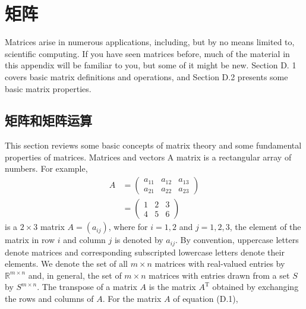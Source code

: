 \documentclass[lang=cn,newtx,10pt,scheme=chinese]{elegantbook}
\begin{document}
\chapter{矩阵}

Matrices arise in numerous applications, including, but by no means limited to, scientific computing. If you have seen matrices before, much of the material in this appendix will be familiar to you, but some of it might be new. Section D. 1 covers basic matrix definitions and operations, and Section D.2 presents some basic matrix properties.

\section{矩阵和矩阵运算}

This section reviews some basic concepts of matrix theory and some fundamental properties of matrices.
Matrices and vectors
A matrix is a rectangular array of numbers. For example,
$$
\begin{aligned}
A & =\left(\begin{array}{lll}
a_{11} & a_{12} & a_{13} \\
a_{21} & a_{22} & a_{23}
\end{array}\right) \\
& =\left(\begin{array}{lll}
1 & 2 & 3 \\
4 & 5 & 6
\end{array}\right)
\end{aligned}
$$
is a $2 \times 3$ matrix $A=\left(a_{i j}\right)$, where for $i=1,2$ and $j=1,2,3$, the element of the matrix in row $i$ and column $j$ is denoted by $a_{i j}$. By convention, uppercase letters denote matrices and corresponding subscripted lowercase letters denote their elements. We denote the set of all $m \times n$ matrices with real-valued entries by $\mathbb{R}^{m \times n}$ and, in general, the set of $m \times n$ matrices with entries drawn from a set $S$ by $S^{m \times n}$.
The transpose of a matrix $A$ is the matrix $A^{\mathrm{T}}$ obtained by exchanging the rows and columns of $A$. For the matrix $A$ of equation (D.1),
\end{document}

